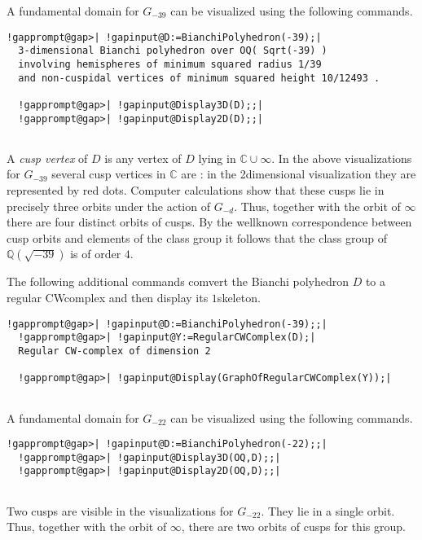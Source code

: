 \documentclass[a4paper,11pt]{report}
\begin{document}
{{A fundamental domain for $G_{-39}$ can be visualized using the following commands. 
\begin{Verbatim}[commandchars=!@|,fontsize=\small,frame=single,label=Example]
  !gapprompt@gap>| !gapinput@D:=BianchiPolyhedron(-39);|
  3-dimensional Bianchi polyhedron over OQ( Sqrt(-39) ) 
  involving hemispheres of minimum squared radius 1/39 
  and non-cuspidal vertices of minimum squared height 10/12493 . 
  
  !gapprompt@gap>| !gapinput@Display3D(D);;|
  !gapprompt@gap>| !gapinput@Display2D(D);;|
  
\end{Verbatim}
   

 A \emph{cusp vertex} of $D$ is any vertex of $D$ lying in $\mathbb C \cup \infty$. In the above visualizations for $G_{-39}$ several cusp vertices in $\mathbb C$ are : in the 2\texttt{}dimensional visualization they are
represented by red dots. Computer calculations show that these cusps lie in
precisely three orbits under the action of $G_{-d}$. Thus, together with the orbit of $\infty$ there are four distinct orbits of cusps. By the well\texttt{}known
correspondence between cusp orbits and elements of the class group it follows
that the class group of $\mathbb Q(\sqrt{-39})$ is of order $4$. 

The following additional commands comvert the Bianchi polyhedron $D$ to a regular CW\texttt{}complex and then display its $1$\texttt{}skeleton. 
\begin{Verbatim}[commandchars=!@|,fontsize=\small,frame=single,label=Example]
  !gapprompt@gap>| !gapinput@D:=BianchiPolyhedron(-39);;|
  !gapprompt@gap>| !gapinput@Y:=RegularCWComplex(D);|
  Regular CW-complex of dimension 2
  
  !gapprompt@gap>| !gapinput@Display(GraphOfRegularCWComplex(Y));|
  
\end{Verbatim}
  

A fundamental domain for $G_{-22}$ can be visualized using the following commands. 
\begin{Verbatim}[commandchars=!@|,fontsize=\small,frame=single,label=Example]
  !gapprompt@gap>| !gapinput@D:=BianchiPolyhedron(-22);;|
  !gapprompt@gap>| !gapinput@Display3D(OQ,D);;|
  !gapprompt@gap>| !gapinput@Display2D(OQ,D);;|
  
\end{Verbatim}
   

Two cusps are visible in the visualizations for $G_{-22}$. They lie in a single orbit. Thus, together with the orbit of $\infty$, there are two orbits of cusps for this group. 

}}
\end{document}
